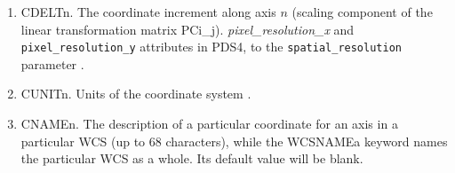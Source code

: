 \begin{enumerate}
\item{CDELTn.
The coordinate increment along axis $n$ (scaling component of the linear transformation
matrix PCi\_j).
\DIFdelbegin {} \DIFdelend \DIFaddbegin {} \DIFaddend \textit{pixel\_resolution\_x} and
\texttt{pixel\_resolution\_y} attributes in PDS4, to the \texttt{spatial\_resolution} parameter
\DIFaddbegin {} \DIFaddend.}
\item{CUNITn.
Units of the coordinate system \DIFdelbegin {}. \DIFdelend \DIFaddbegin {}}
\DIFaddend \item{CNAMEn.
The description of a particular coordinate for an axis in a particular WCS (up to 68
characters), while the WCSNAMEa keyword names the particular WCS as a whole.
Its default value will be blank.}
\end{enumerate}


